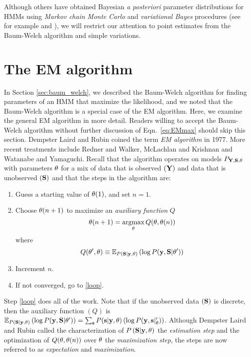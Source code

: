 Although others have obtained Bayesian \emph{a posteriori} parameter
distributions for HMMs using \emph{Markov chain Monte Carlo} and
\emph{variational Bayes} procedures (see for example \cite{Rosales04}
and \cite{Beal03}), we will restrict our attention to point estimates
from the Baum-Welch algorithm and simple variations.



\section{The EM algorithm}
\label{sec:EM}
%
%

In Section \ref{sec:baum_welch}, we described the Baum-Welch algorithm
for finding parameters of an HMM that maximize the likelihood, and we
noted that the Baum-Welch algorithm is a special case of the EM
algorithm.  Here, we examine the general EM algorithm in more detail.
Readers willing to accept the Baum-Welch algorithm without further
discussion of Eqn.~\ref{eq:EMmax} should skip this section.  Dempster
Laird and Rubin\cite{Dempster77} coined the term \emph{EM algorithm}
in 1977.  More recent treatments include Redner and
Walker\cite{Redner84}, McLachlan and Krishnan\cite{McLachlan96} and
Watanabe and Yamaguchi\cite{Watanabe04}.  
%
Recall that the algorithm operates on models $P_{{\bf Y},{\bf S},\theta} $
with parameters $\theta$ for a mix of data that is observed
$({\bf Y})$ and data that is unobserved $({\bf S})$ and that the steps in the
algorithm are:
\begin{enumerate}
\item Guess a starting value of ${\theta}{(1)}$, and set $n=1$.
\item \label{loop} Choose ${\theta}{(n+1)}$ to maximize
  an \emph{auxiliary function} $Q$
  \begin{equation}
    \label{eq:EMmax2}
    {\theta}{(n+1)} = \operatorname*{argmax}_{\theta} Q(\theta,
    {\theta}{(n)})
  \end{equation}
  where
  \begin{equation}
    \label{eq:Qdef2}
    Q(\theta',\theta) \equiv \mathbb{E}_{P\left({\bf S}|\mathbf{y}, \theta \right)}
    \left( \log P(\mathbf{y},{\bf S}|\theta') \right)
  \end{equation}
\item Increment $n$.
\item If not converged, go to \ref{loop}.
\end{enumerate}
Step \ref{loop} does all of the work.  Note that if the unobserved
data $({\bf S})$ is discrete, then the auxiliary function $(Q)$ is
$\mathbb{E}_{P\left({\bf S}|\mathbf{y},\theta \right)} \left( \log
  P(\mathbf{y},{\bf S}|\theta') \right) = \sum_{\bf s} P({\bf s}|\mathbf{y},\theta) \left(
  \log P(\mathbf{y},{\bf s}|_\theta') \right)$.  Although Dempster Laird and
Rubin \cite{Dempster77} called the characterization of $P
\left({\bf S}|\mathbf{y},\theta \right)$ the \emph{estimation step} and the
optimization of $Q(\theta, {\theta}{(n)})$ over
$\theta$ the \emph{maximization step}, the steps are now referred
to as \emph{expectation} and \emph{maximization}.

